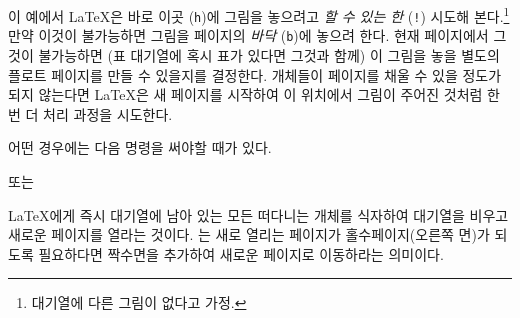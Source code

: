 \noindent 이 예에서 
\LaTeX 은 바로 이곳 (\texttt{h})에 그림을 놓으려고 \emph{할 수 있는 한} (\texttt{!})
시도해 본다.\footnote{대기열에 다른 그림이 없다고 가정.}
만약 이것이 불가능하면 그림을 페이지의 \emph{바닥} (\texttt{b})에 놓으려 한다.
현재 페이지에서 그것이 불가능하면 (표 대기열에 혹시 표가 있다면 그것과 함께) 이 그림을 
놓을 별도의 플로트 페이지를 만들 수 있을지를 결정한다. 
개체들이 페이지를 채울 수 있을 정도가 되지 않는다면 \LaTeX 은 새 페이지를 시작하여
이 위치에서 그림이 주어진 것처럼 한 번 더 처리 과정을 시도한다.

어떤 경우에는 다음 명령을 써야할 때가 있다.

\begin{lscommand}
 또는 
\end{lscommand}

\noindent \LaTeX 에게 즉시 대기열에 남아 있는 모든 떠다니는 개체를 
식자하여 대기열을 비우고 새로운 페이지를 열라는 것이다. 는 
새로 열리는 페이지가 홀수페이지(오른쪽 면)가 되도록 필요하다면 짝수면을 추가하여 새로운 페이지로 
이동하라는 의미이다.

